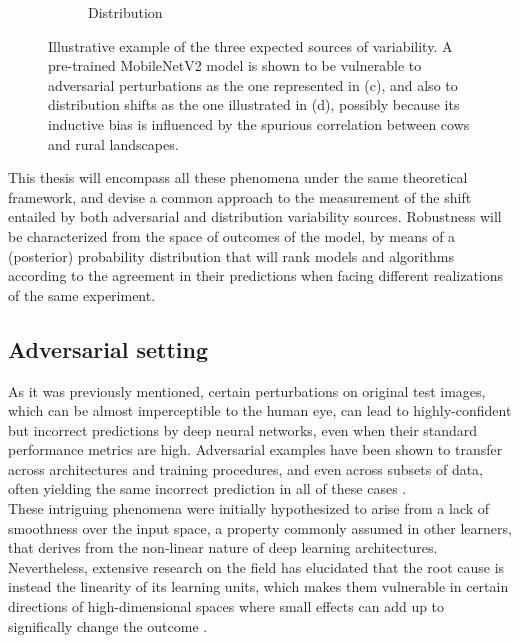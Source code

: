 \begin{figure}
\begin{subfigure}[b]{0.22\textwidth}
        \caption{Distribution}
    \end{subfigure}
       \caption{Illustrative example of the three expected sources of variability. 
       A pre-trained MobileNetV2 model is shown to be vulnerable to adversarial perturbations 
       as the one represented in (c), and also to distribution shifts 
       as the one illustrated in (d), possibly because its inductive bias is influenced
       by the spurious correlation between cows and rural landscapes.}
       \label{fig:cows}
\end{figure}

This thesis will encompass all these phenomena under the same theoretical
framework, and devise a common approach to the measurement of
the shift entailed by both adversarial and distribution
variability sources. Robustness will be characterized from the space of
outcomes of the model, by means of a (posterior) probability 
distribution that will rank models and algorithms according to the
agreement in their predictions when facing different realizations of the same experiment.

\subsection{Adversarial setting}

As it was previously mentioned, certain perturbations on
original test images, which can be almost imperceptible
to the human eye, can lead to highly-confident but
incorrect predictions by deep neural networks, even when their
standard performance metrics are high.
Adversarial examples have been shown to transfer
across architectures and training procedures, and
even across subsets of data,
often yielding the same incorrect prediction in
all of these cases \cite{szegedyIntriguingPropertiesNeural2014}. \\

These intriguing phenomena were initially hypothesized to arise 
from a lack of smoothness over the input space, a property
commonly assumed in other learners, that derives from the
non-linear nature of deep learning architectures. Nevertheless,
extensive research on the field has elucidated that the root
cause is instead the linearity of its learning units, which makes them
vulnerable in certain directions of high-dimensional
spaces where small
effects can add up to significally change the outcome
\cite{goodfellowExplainingHarnessingAdversarial2015}. \\

